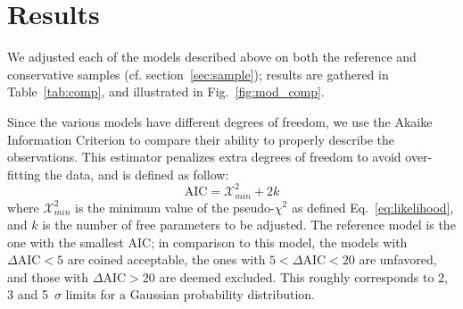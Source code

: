 \documentclass[]{aa} %
\newcommand{\yc}[1]{{\textcolor{BrickRed}{#1}}}
\begin{document}
\section{Results}\label{sec:results}

We \yc{adjusted} each of the models described above on both the reference and conservative samples (cf.
section~\ref{sec:sample}); \yc{results are gathered in Table~\ref{tab:comp}, and illustrated in Fig.~\ref{fig:mod_comp}.} 

\yc{Since} the \yc{various} models have different degrees of freedom, we use the Akaike
Information Criterion \citep[AIC, e.g.][]{burnham2004} to compare \yc{their ability to properly describe the observations}. This
estimator penalizes extra degrees of freedom to avoid over-fitting the data, and
is defined as follow:
\begin{equation}
    \mathrm{AIC} = \mathcal{X}^2_{min} + 2k
\end{equation}
where $\mathcal{X}^2_{min}$ is the minimum value of the pseudo-$\chi^2$ as
defined Eq.~\eqref{eq:likelihood}, and $k$ is the number of free parameters \yc{to be adjusted}. The
reference model is the one with the smallest AIC; in comparison to this model,
the models with $\Delta\mathrm{AIC}<5$ are \yc{coined} acceptable, the ones with
$5<\Delta\mathrm{AIC}<20$ are unfavored, and those with $\Delta\mathrm{AIC}>20$
are \yc{deemed} excluded. This roughly corresponds to 2, 3 and 5~$\sigma$ limits for a
Gaussian probability distribution.
\end{document}

